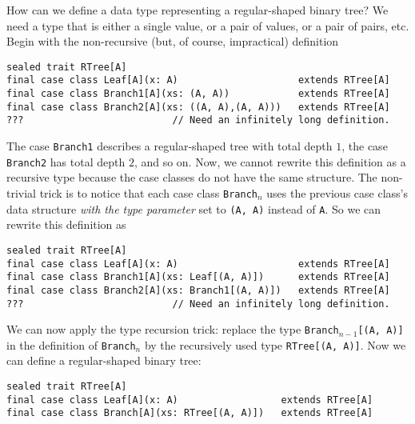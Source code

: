 How can we define a data type representing a regular-shaped binary
tree? We need a type that is either a single value, or a pair of values,
or a pair of pairs, etc. Begin with the non-recursive (but, of course,
impractical) definition
\begin{lstlisting}
sealed trait RTree[A]
final case class Leaf[A](x: A)                     extends RTree[A]
final case class Branch1[A](xs: (A, A))            extends RTree[A]
final case class Branch2[A](xs: ((A, A),(A, A)))   extends RTree[A]
???                          // Need an infinitely long definition.
\end{lstlisting}
The case \lstinline!Branch1! describes a regular-shaped tree with
total depth $1$, the case \lstinline!Branch2! has total depth $2$,
and so on. Now, we cannot rewrite this definition as a recursive type
because the case classes do not have the same structure. The non-trivial
trick is to notice that each case class \lstinline!Branch!$_{n}$
uses the previous case class\textsf{'}s data structure \emph{with the type
parameter} set to \lstinline!(A, A)! instead of \lstinline!A!. So
we can rewrite this definition as
\begin{lstlisting}
sealed trait RTree[A]
final case class Leaf[A](x: A)                     extends RTree[A]
final case class Branch1[A](xs: Leaf[(A, A)])      extends RTree[A]
final case class Branch2[A](xs: Branch1[(A, A)])   extends RTree[A]
???                          // Need an infinitely long definition.
\end{lstlisting}
We can now apply the type recursion trick: replace the type \lstinline!Branch!$_{n-1}$\lstinline![(A, A)]!
in the definition of \lstinline!Branch!$_{n}$ by the recursively
used type \lstinline!RTree[(A, A)]!. Now we can define a regular-shaped
binary tree:
\begin{lstlisting}
sealed trait RTree[A]
final case class Leaf[A](x: A)                  extends RTree[A]
final case class Branch[A](xs: RTree[(A, A)])   extends RTree[A]
\end{lstlisting}

